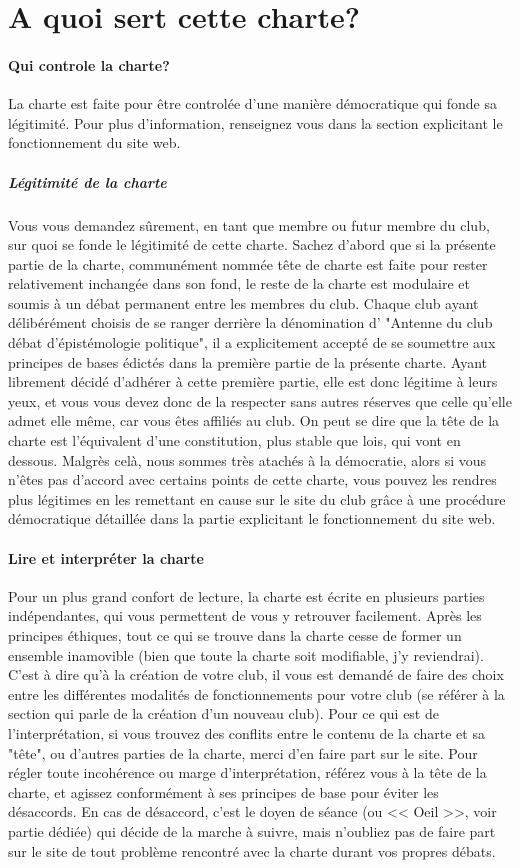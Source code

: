 \documentclass[a4paper,12pt]{article}
\begin{document}
\section{A quoi sert cette charte?}

\paragraph{Qui controle la charte?}
La charte est faite pour être controlée d'une manière démocratique qui fonde sa légitimité. Pour plus d'information, renseignez vous dans la section explicitant le fonctionnement du site web.
\subparagraph{Légitimité de la charte}
Vous vous demandez sûrement, en tant que membre ou futur membre du club, sur quoi se fonde le légitimité de cette charte. Sachez d'abord que si la présente partie de la charte, communément nommée tête de charte est faite pour rester relativement inchangée dans son fond, le reste de la charte est modulaire et soumis à un débat permanent entre les membres du club. Chaque club ayant délibérément choisis de se ranger derrière la dénomination d' "Antenne du club débat d'épistémologie politique", il a explicitement accepté de se soumettre aux principes de bases édictés dans la première partie de la présente charte. Ayant librement décidé d'adhérer à cette première partie, elle est donc légitime à leurs yeux, et vous vous devez donc de la respecter sans autres réserves que celle qu'elle admet elle même, car vous êtes affiliés au club. On peut se dire que la tête de la charte est l'équivalent d'une constitution, plus stable que lois, qui vont en dessous. Malgrès celà, nous sommes très atachés à la démocratie, alors si vous n'êtes pas d'accord avec certains points de cette charte, vous pouvez les rendres plus légitimes en les remettant en cause sur le site du club grâce à une procédure démocratique détaillée dans la partie explicitant le fonctionnement du site web.

\paragraph{Lire et interpréter la charte}
Pour un plus grand confort de lecture, la charte est écrite en plusieurs parties indépendantes, qui vous permettent de vous y retrouver facilement. Après les principes éthiques, tout ce qui se trouve dans la charte cesse de former un ensemble inamovible (bien que toute la charte soit modifiable, j'y reviendrai). C'est à dire qu'à la création de votre club, il vous est demandé de faire des choix entre les différentes modalités de fonctionnements pour votre club (se référer à la section qui parle de la création d'un nouveau club). Pour ce qui est de l'interprétation, si vous trouvez des conflits entre le contenu de la charte et sa "tête", ou d'autres parties de la charte, merci d'en faire part sur le site. Pour régler toute incohérence ou marge d'interprétation, référez vous à la tête de la charte, et agissez conformément à ses principes de base pour éviter les désaccords. En cas de désaccord, c'est le doyen de séance (ou << Oeil >>, voir partie dédiée) qui décide de la marche à suivre, mais n'oubliez pas de faire part sur le site de tout problème rencontré avec la charte durant vos propres débats.
\end{document}
